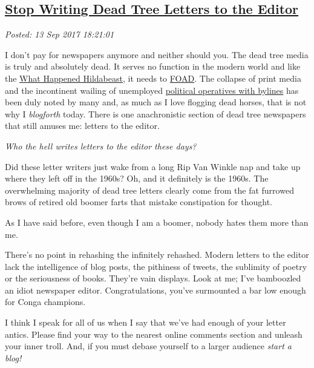 %

\subsection*{\href{http://analyzethedatanotthedrivel.org/2017/09/13/stop-writing-dead-tree-letters-to-the-editor/}{Stop Writing Dead Tree Letters to the Editor}}


\noindent\emph{Posted: 13 Sep 2017 18:21:01}
\vspace{6pt}

I don't pay for newspapers anymore and neither should you. The dead tree
media is truly and absolutely dead. It serves no function in the modern
world and like the
\href{https://www.youtube.com/watch?v=yzDHHMWDC_k}{What Happened
Hildabeast}, it needs to
\href{https://www.acronymfinder.com/FOAD.html}{FOAD}. The collapse of
print media and the incontinent wailing of unemployed
\href{http://smallestminority.blogspot.com/2015/07/quote-of-day-democratic-operatives-with.html}{political
operatives with bylines} has been duly noted by many and, as much as I
love flogging dead horses, that is not why I \emph{blogforth} today.
There is one anachronistic section of dead tree newspapers that still
amuses me: letters to the editor.

\emph{Who the hell writes letters to the editor these days?}

Did these letter writers just wake from a long Rip Van Winkle nap and
take up where they left off in the 1960s? Oh, and it definitely is the
1960s. The overwhelming majority of dead tree letters clearly come from
the fat furrowed brows of retired old boomer farts that mistake
constipation for thought.

As I have said before, even though I am a boomer, nobody hates them more
than me.

There's no point in rehashing the infinitely rehashed. Modern letters to
the editor lack the intelligence of blog posts, the pithiness of tweets,
the sublimity of poetry or the seriousness of books. They're vain
displays. Look at me; I've bamboozled an idiot newspaper editor.
Congratulations, you've surmounted a bar low enough for Conga champions.

I think I speak for all of us when I say that we've had enough of your
letter antics. Please find your way to the nearest online comments
section and unleash your inner troll. And, if you must debase yourself
to a larger audience \emph{start a blog!}



%

